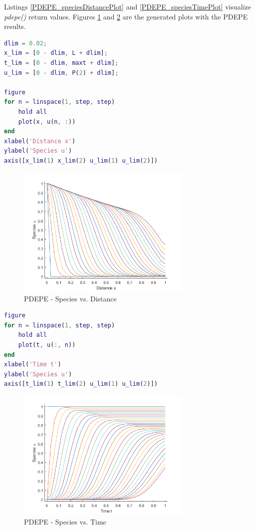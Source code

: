 \documentclass{article}
\begin{document}
Listings \ref{PDEPE_speciesDistancePlot} and \ref{PDEPE_speciesTimePlot} visualize \emph{pdepe()} return values. Figures \ref{fig_PDEPE_Species_vs_Distance} and \ref{PDEPE_Species_vs_Time} are the generated plots with the PDEPE results.

\begin{lstlisting}[language=Matlab, caption=PDEPE Distance vs. Species plot, label=PDEPE_speciesDistancePlot]
% plot limits
dlim = 0.02;
x_lim = [0 - dlim, L + dlim];
t_lim = [0 - dlim, maxt + dlim];
u_lim = [0 - dlim, P(2) + dlim];

figure
for n = linspace(1, step, step)
    hold all
    plot(x, u(n, :))
end
xlabel('Distance x')
ylabel('Species u')
axis([x_lim(1) x_lim(2) u_lim(1) u_lim(2)])
\end{lstlisting}

\begin{figure}[h!]
\centering
\includegraphics[width=0.75\textwidth]{./img/PDEPE_Species_vs_Distance.png}
\caption{PDEPE - Species vs. Distance}
\label{fig_PDEPE_Species_vs_Distance}
\end{figure}

\begin{lstlisting}[float, language=Matlab, caption=PDEPE Time vs. Species plot, label=PDEPE_speciesTimePlot]
figure
for n = linspace(1, step, step)
    hold all
    plot(t, u(:, n))
end
xlabel('Time t')
ylabel('Species u')
axis([t_lim(1) t_lim(2) u_lim(1) u_lim(2)])
\end{lstlisting}

\begin{figure}[h!]
\centering
\includegraphics[width=0.75\textwidth]{./img/PDEPE_Species_vs_Time.png}
\caption{PDEPE - Species vs. Time}
\label{PDEPE_Species_vs_Time}
\end{figure}
\end{document}
